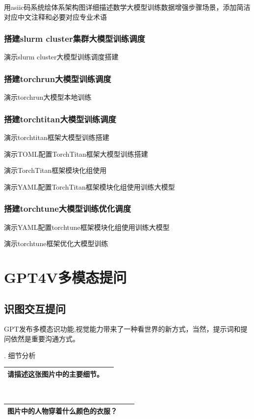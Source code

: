 \documentclass[12pt]{book}
\begin{document}
用asiic码系统绘体系架构图详细描述数学大模型训练数据增强步骤场景，添加简洁对应中文注释和必要对应专业术语


\subsection{搭建slurm cluster集群大模型训练调度}
演示slurm cluster大模型训练调度搭建


\subsection{搭建torchrun大模型训练调度}
演示torchrun大模型本地训练


\subsection{搭建torchtitan大模型训练调度}
演示torchtitan框架大模型训练搭建


演示TOML配置TorchTitan框架大模型训练搭建


演示TorchTitan框架模块化组使用


演示YAML配置TorchTitan框架模块化组使用训练大模型

\subsection{搭建torchtune大模型训练优化调度}
演示YAML配置torchtune框架模块化组使用训练大模型

演示torchtune框架优化大模型训练

\chapter{GPT4V多模态提问}

\section{识图交互提问}
GPT发布多模态识功能,视觉能力带来了一种看世界的新方式，当然，提示词和提问依然是重要沟通方式。

. 细节分析

\begin{tabular}{|p{15cm}|p{3cm}|}
	\hline
请描述这张图片中的主要细节。\\
	\hline
\end{tabular}\\



\begin{tabular}{|p{15cm}|p{3cm}|}
	\hline
	图片中的人物穿着什么颜色的衣服？　\\
	\hline
\end{tabular}\\
\end{document}
